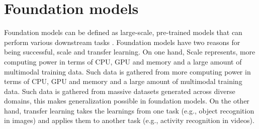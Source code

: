 \section{Foundation models}
Foundation models can be defined as large-scale, pre-trained models that can perform various downstream tasks \cite{bommasani2022opportunitiesrisksfoundationmodels}. 
Foundation models have two reasons for being successful, scale and transfer learning. On one hand, Scale represents,
more computing power in terms of CPU, GPU and memory and a large amount of multimodal training data. Such data is gathered from 
more computing power in terms of CPU, GPU and memory and a large amount of multimodal training data. Such data is gathered from 
massive datasets generated across diverse domains, this makes generalization possible in foundation models. On the other hand, transfer
learning takes the learnings from one task (e.g., object recognition in images) and
applies them to another task (e.g., activity recognition in videos). 

